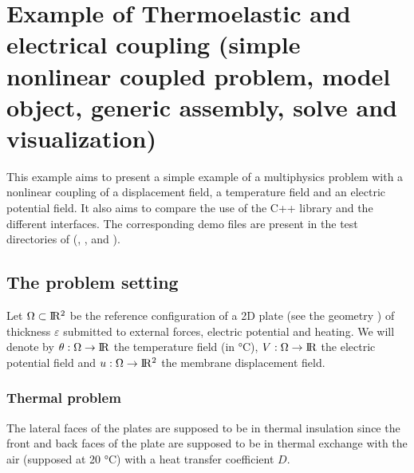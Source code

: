 \documentclass[a4paper,11pt,english]{sphinxmanual}
\begin{document}
\chapter{Example of Thermo\sphinxhyphen{}elastic and electrical coupling (simple nonlinear coupled problem, model object, generic assembly, solve and visualization)}
\label{\detokenize{tutorial/thermo_coupling:example-of-thermo-elastic-and-electrical-coupling-simple-nonlinear-coupled-problem-model-object-generic-assembly-solve-and-visualization}}\label{\detokenize{tutorial/thermo_coupling:tut-thermo-elec-coupling}}\label{\detokenize{tutorial/thermo_coupling::doc}}
This example aims to present a simple example of a multiphysics problem with a nonlinear coupling of a displacement field, a temperature field and an electric potential field. It also aims to compare the use of the C++ library and the different interfaces. The corresponding demo files are present in the test directories of  (, ,  and ).


\section{The problem setting}
\label{\detokenize{tutorial/thermo_coupling:the-problem-setting}}
Let \(\Omega \subset \rm I\hspace{-0.15em}R^2\) be the reference configuration of a 2D plate (see the geometry {\hyperref[\detokenize{tutorial/thermo_coupling:tut-fig-meshthermo}]{}}) of thickness \(\varepsilon\) submitted to external forces, electric potential and heating. We will denote by  \(\theta : \Omega \rightarrow \rm I\hspace{-0.15em}R\) the temperature field (in °C),  \(V : \Omega \rightarrow \rm I\hspace{-0.15em}R\) the electric potential field and \(u : \Omega \rightarrow \rm I\hspace{-0.15em}R^2\) the membrane displacement field.


\subsection{Thermal problem}
\label{\detokenize{tutorial/thermo_coupling:thermal-problem}}
The lateral faces of the plates are supposed to be in thermal insulation since the front and back faces of the plate are supposed to be in thermal exchange with the air (supposed at 20 °C) with a heat transfer coefficient \(D\).
\end{document}
